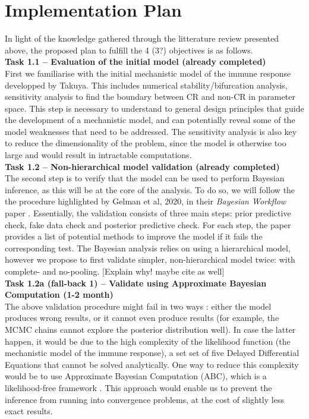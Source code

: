 \documentclass[11pt]{article}
\begin{document}
\section{Implementation Plan}\label{sec:plan}
In light of the knowledge gathered through the litterature review presented above, the proposed plan to fulfill the 4 (3?) objectives is as follows.\\[12pt]
%
\noindent\textbf{Task 1.1 -- Evaluation of the initial model (already completed)}\\
First we familiarise with the initial mechanistic model of the immune response developped by Takuya. This includes numerical stability/bifurcation analysis, sensitivity analysis to find the boundary between CR and non-CR in parameter space. This step is necessary to understand to general design principles that guide the development of a mechanistic model, and can potentially reveal some of the model weaknesses that need to be addressed. The sensitivity analysis is also key to reduce the dimensionality of the problem, since the model is otherwise too large and would result in intractable computations.\\[12pt]
%
\noindent\textbf{Task 1.2 -- Non-hierarchical model validation (already completed)}\\ 
The second step is to verify that the model can be used to perform Bayesian inference, as this will be at the core of the analysis. To do so, we will follow the the procedure highlighted by Gelman et al, 2020, in their \textit{Bayesian Workflow} paper \cite{gelman2020bayesian}. Essentially, the validation consists of three main steps: prior predictive check, fake data check and posterior predictive check. For each step, the paper provides a list of potential methods to improve the model if it fails the corresponding test. The Bayesian analysis relies on using a hierarchical model, however we propose to first validate simpler, non-hierarchical model twice: with complete- and no-pooling. [Explain why! maybe cite as well]\\[12pt]
%
\noindent\textbf{Task 1.2a (fall-back 1) -- Validate using Approximate Bayesian Computation (1-2 month)}\\ 
The above validation procedure might fail in two ways : either the model produces wrong results, or it cannot even produce results (for example, the MCMC chains cannot explore the posterior distribution well). In case the latter happen, it would be due to the high complexity of the likelihood function (the mechanistic model of the immune response), a set set of five Delayed Differential Equations that cannot be solved analytically. One way to reduce this complexity would be to use Approximate Bayesian Computation (ABC), which is a likelihood-free framework \cite{ABCtuber}. This approach would enable us to prevent the inference from running into convergence problems, at the cost of slightly less exact results. \\[12pt]
\end{document}
